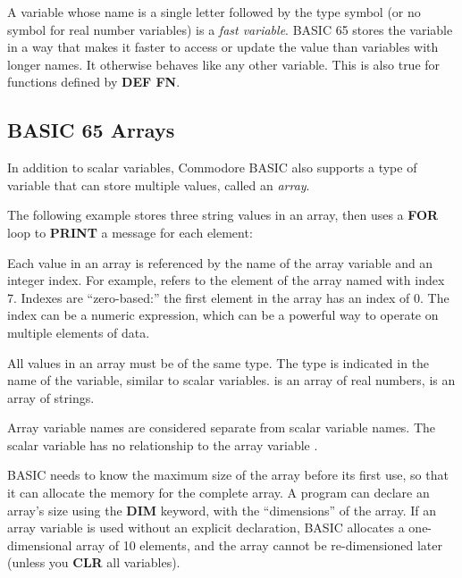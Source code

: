 A variable whose name is a single letter followed by the type symbol (or no symbol for real number variables) is a {\em fast variable}. BASIC 65 stores the variable in a way that makes it faster to access or update the value than variables with longer names. It otherwise behaves like any other variable. This is also true for functions defined by {\bf DEF FN}.

\subsection{BASIC 65 Arrays}

In addition to scalar variables, Commodore BASIC also supports a type of variable that can store multiple values, called an {\em array}.

The following example stores three string values in an array, then uses a {\bf FOR} loop to {\bf PRINT} a message for each element:


Each value in an array is referenced by the name of the array variable and an integer index. For example,  refers to the element of the array named  with index 7. Indexes are ``zero-based:'' the first element in the array has an index of 0. The index can be a numeric expression, which can be a powerful way to operate on multiple elements of data.

All values in an array must be of the same type. The type is indicated in the name of the variable, similar to scalar variables.  is an array of real numbers,  is an array of strings.

Array variable names are considered separate from scalar variable names. The scalar variable  has no relationship to the array variable .

BASIC needs to know the maximum size of the array before its first use, so that it can allocate the memory for the complete array. A program can declare an array's size using the {\bf DIM} keyword, with the ``dimensions'' of the array. If an array variable is used without an explicit declaration, BASIC allocates a one-dimensional array of 10 elements, and the array cannot be re-dimensioned later (unless you {\bf CLR} all variables).

